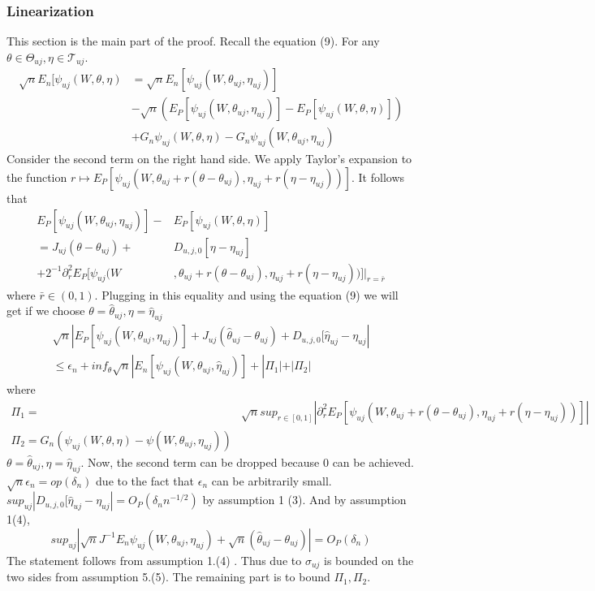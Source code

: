 \documentclass{article}
\begin{document}
\subsubsection{Linearization}
This section is the main part of the proof. Recall the equation (9). For any $\theta\in \Theta_{uj},\eta\in \mathcal{T}_{uj}$. 
\begin{align*}
    \sqrt{n}E_n[\psi_{uj}(W,\theta,\eta)&=\sqrt{n}E_n[\psi_{uj}(W,\theta_{uj},\eta_{uj})]\\
    &-\sqrt{n}(E_P[\psi_{uj}(W,\theta_{uj},\eta_{uj})]-E_P[\psi_{uj}(W,\theta,\eta)])\\
    &+G_n\psi_{uj}(W,\theta,\eta)-G_n\psi_{uj}(W,\theta_{uj},\eta_{uj})
\end{align*}
Consider the second term on the right hand side. We apply Taylor's expansion to the function $r \mapsto E_P[\psi_{uj}(W,\theta_{uj}+r(\theta-\theta_{uj}),\eta_{uj}+r(\eta-\eta_{uj}))]$. It follows that
\begin{equation}
    \begin{split}
        E_P[\psi_{uj}(W,\theta_{uj},\eta_{uj})]-&E_P[\psi_{uj}(W,\theta,\eta)]\\
        =J_{uj}(\theta-\theta_{uj})+&D_{u,j,0}[\eta-\eta_{uj}]\\
        +2^{-1}\partial_r^2 E_P[\psi_{uj}(W&,\theta_{uj}+r(\theta-\theta_{uj}),\eta_{uj}+r(\eta-\eta_{uj}))]|_{r=\bar{r}}
    \end{split}
\end{equation}
where $\bar{r}\in (0,1)$. Plugging in this equality and using the equation (9) we will get if we choose $\theta=\hat{\theta}_{uj},\eta=\hat{\eta}_{uj}$
\begin{equation}
    \begin{split}
        \sqrt{n}|E_P[\psi_{uj}(W,\theta_{uj},\eta_{uj})]+J_{uj}(\hat{\theta}_{uj}-\theta_{uj})+D_{u,j,0}[\hat{\eta}_{uj}-\eta_{uj}|\\
        \leq \epsilon_n+inf_{\theta}\sqrt{n}|E_n[\psi_{uj}(W,\theta_{uj},\hat{\eta}_{uj})]+|\Pi_1|+|\Pi_2|
    \end{split}
\end{equation}
where 
\begin{align*}
    \Pi_1=&\sqrt{n}sup_{r\in [0,1]}| \partial_r^2 E_P[\psi_{uj}(W,\theta_{uj}+r(\theta-\theta_{uj}),\eta_{uj}+r(\eta-\eta_{uj}))]|\\
    \Pi_2=G_n(\psi_{uj}(W,\theta,\eta)-\psi(W,\theta_{uj},\eta_{uj}))
\end{align*}
$\theta=\hat{\theta}_{uj},\eta=\hat{\eta}_{uj}$. Now, the second term can be dropped because 0 can be achieved. $\sqrt{n}\epsilon_n=op(\delta_n)$ due to the fact that $\epsilon_n$ can be arbitrarily small. $sup_{uj}|D_{u,j,0}[\hat{\eta}_{uj}-\eta_{uj}|=O_P(\delta_n n^{-1/2})$ by assumption 1 (3). And by assumption 1(4), 
\begin{equation}
    sup_{uj}|\sqrt{n}J^{-1}E_n\psi_{uj}(W,\theta_{uj},\eta_{uj})+\sqrt{n}(\hat{\theta}_{uj}-\theta_{uj})|=O_P(\delta_n)
\end{equation}
The statement follows from assumption 1.(4) . Thus due to $\sigma_{uj}$ is bounded on the two sides from assumption 5.(5). The remaining part is to bound $\Pi_1,\Pi_2$.
\end{document}
